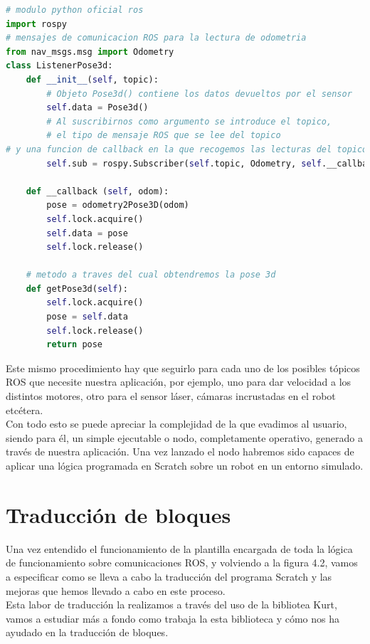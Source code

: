 \begin{lstlisting}[language=python,firstnumber=1]
# modulo python oficial ros
import rospy
# mensajes de comunicacion ROS para la lectura de odometria
from nav_msgs.msg import Odometry
class ListenerPose3d:
    def __init__(self, topic):
    	# Objeto Pose3d() contiene los datos devueltos por el sensor
        self.data = Pose3d() 
        # Al suscribirnos como argumento se introduce el topico,
        # el tipo de mensaje ROS que se lee del topico
# y una funcion de callback en la que recogemos las lecturas del topico
        self.sub = rospy.Subscriber(self.topic, Odometry, self.__callback)

    def __callback (self, odom):
        pose = odometry2Pose3D(odom)
        self.lock.acquire()
        self.data = pose
        self.lock.release()
        
    # metodo a traves del cual obtendremos la pose 3d    
    def getPose3d(self):
        self.lock.acquire()
        pose = self.data
        self.lock.release()
        return pose
\end{lstlisting}

Este mismo procedimiento hay que seguirlo para cada uno de los posibles tópicos ROS que necesite nuestra aplicación, por ejemplo, uno para dar velocidad a los distintos motores, otro para el sensor láser, cámaras incrustadas en el robot etcétera.\\

Con todo esto se puede apreciar la complejidad de la que evadimos al usuario, siendo para él, un simple ejecutable o nodo, completamente operativo, generado a través de nuestra aplicación. Una vez lanzado el nodo habremos sido capaces de aplicar una lógica programada en Scratch sobre un robot en un entorno simulado. 


\section{Traducción de bloques}
Una vez entendido el funcionamiento de la plantilla encargada de toda la lógica de funcionamiento sobre comunicaciones ROS, y volviendo a la figura 4.2, vamos a especificar como se lleva a cabo la traducción del programa Scratch y las mejoras que hemos llevado a cabo en este proceso.\\

Esta labor de traducción la realizamos a través del uso de la bibliotea Kurt, vamos a estudiar más a fondo como trabaja la esta biblioteca y cómo nos ha ayudado en la traducción de bloques.\\

